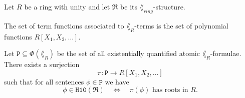 \begin{thm}\label{thm:Diophantine theory}
  Let \(R\) be a ring with unity and let \(\mathfrak{R}\) be its
  \(\lang_{ring}\)-structure.
  \begin{thmlist}
    \item The set of term functions associated to \(\lang_R\)-terms is the set
    of polynomial functions \(R[X_1, X_2, …]\).

    \item Let \(\mathtt{P} \subseteq Φ(\lang_R)\) be the set of all
    existentially quantified atomic \(\lang_R\)-formulae. There exists a
    surjection
    \[
      π: \mathtt{P} → R[X_1, X_2, …]
    \]
    such that for all sentences \(ϕ ∈ \mathtt{P}\) we have
    \[
      ϕ ∈ \mathtt{H10}(\mathfrak{R}) \quad ⇔ \quad
      π(ϕ) \text{ has roots in } R.
    \]
  \end{thmlist}
\end{thm}
